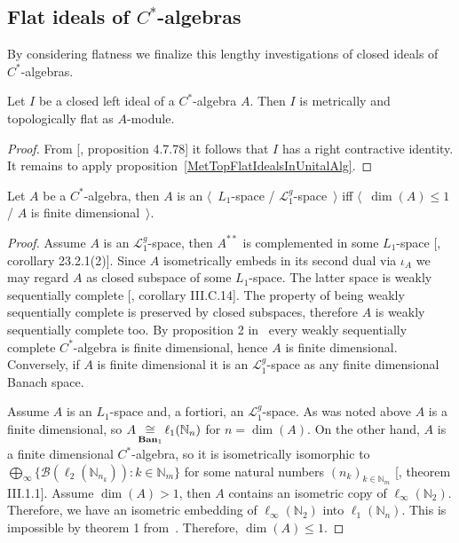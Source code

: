 
\subsection{
    Flat ideals of \texorpdfstring{$C^*$}{C*}-algebras}\label{
SubSectionFlatIdealsOfCStarAlgebras}

By considering flatness we finalize this lengthy investigations of closed ideals of
$C^*$-algebras.

\begin{proposition}\label{IdealofCstarAlgisMetTopFlat} Let $I$ be a closed left ideal
of a $C^*$-algebra $A$. Then $I$ is metrically and topologically flat as
$A$-module.
\end{proposition}
\begin{proof} From [\cite{HelBanLocConvAlg}, proposition 4.7.78] it follows that
$I$ has a right contractive identity. It remains to apply
proposition~\ref{MetTopFlatIdealsInUnitalAlg}.
\end{proof}

\begin{proposition}\label{CStarAlgIsL1IfFinDim} Let $A$ be a $C^*$-algebra, then
$A$ is an $\langle$~$L_1$-space / $\mathscr{L}_1^g$-space~$\rangle$ iff
$\langle$~$\operatorname{dim}(A)\leq 1$ / $A$ is finite dimensional~$\rangle$.
\end{proposition}
\begin{proof} Assume $A$ is an $\mathscr{L}_1^g$-space, then $A^{**}$ is
complemented in some $L_1$-space [\cite{DefFloTensNorOpId}, corollary
23.2.1(2)]. Since $A$ isometrically embeds in its second dual via $\iota_{A}$ we
may regard $A$ as closed subspace of some $L_1$-space. The latter space is
weakly sequentially complete [\cite{WojBanSpForAnalysts}, corollary III.C.14].
The property of being weakly sequentially complete is preserved by closed
subspaces, therefore $A$ is weakly sequentially complete too. By proposition 2
in~\cite{SakWeakCompOpOnOpAlg} every weakly sequentially complete $C^*$-algebra
is finite dimensional, hence $A$ is finite dimensional. Conversely, if $A$ is
finite dimensional it is an $\mathscr{L}_1^g$-space as any finite dimensional
Banach space.

Assume $A$ is an $L_1$-space and, a fortiori, an $\mathscr{L}_1^g$-space. As was
noted above $A$ is a finite dimensional, so
$A\mathop{\mathbin{\cong}}\limits_{\mathbf{Ban}_1}\ell_1(\mathbb{N}_n)$ for $n=\operatorname{dim}(A)$. On
the other hand, $A$ is a finite dimensional $C^*$-algebra, so it is
isometrically isomorphic to $\bigoplus_\infty \{
\mathcal{B}(\ell_2(\mathbb{N}_{n_k})):k\in\mathbb{N}_m \}$ for some natural
numbers ${(n_k)}_{k\in\mathbb{N}_m}$ 
[\cite{DavCSatrAlgByExmpl}, theorem III.1.1].
Assume $\operatorname{dim}(A)>1$, then $A$ contains an isometric copy of
$\ell_\infty(\mathbb{N}_2)$. Therefore, we have an isometric embedding of
$\ell_\infty(\mathbb{N}_2)$ into $\ell_1(\mathbb{N}_n)$. This is impossible by
theorem 1 from~\cite{LyubIsomEmdbFinDimLp}. 
Therefore, $\operatorname{dim}(A)\leq 1$. 
\end{proof}

